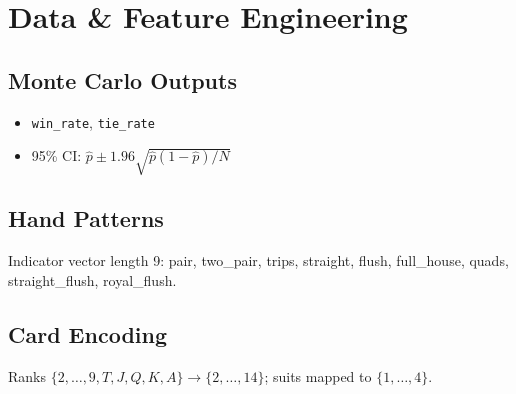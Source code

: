 \section{Data \& Feature Engineering}

\subsection{Monte Carlo Outputs}
\begin{itemize}
  \item \texttt{win\_rate}, \texttt{tie\_rate}
  \item 95\% CI: $\hat{p}\pm1.96\sqrt{\hat{p}(1-\hat{p})/N}$
\end{itemize}

\subsection{Hand Patterns}
Indicator vector length 9: pair, two\_pair, trips, straight, flush, full\_house, quads, straight\_flush, royal\_flush.

\subsection{Card Encoding}
Ranks $\{2,\dots,9,T,J,Q,K,A\}\to\{2,\dots,14\}$; suits mapped to $\{1,\dots,4\}$.

